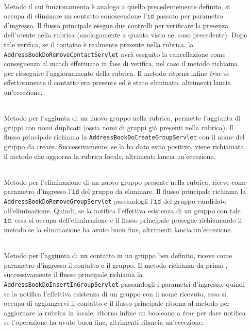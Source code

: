 \begin{description}
	\item{}\\
Metodo il cui funzionamento è analogo a quello precedentemente definito, si occupa di eliminare un contatto conoscendone l'\texttt{id} passato per parametro d'ingresso. Il flusso principale esegue due controlli per verificare la presenza dell'utente nella rubrica (analogamente a quanto visto nel caso precedente). 
Dopo tale verifica, se il contatto è realmente presente nella rubrica, la  \texttt{AddressBookDoRemoveContactServlet} avrà eseguito la cancellazione come conseguenza al match effettuato in fase di verifica, nel caso il metodo richiama  per rieseguire l'aggiornamento della rubrica. Il metodo ritorna infine \textit{true} se effettivamente il contatto era presente ed è stato eliminato, altrimenti lancia un'eccezione.

	\item{}\\
	Metodo per l'aggiunta di un nuovo gruppo nella rubrica, permette l'aggiunta di gruppi con nomi duplicati (ossia nomi di gruppi già presenti nella rubrica). Il flusso principale richiama la  \texttt{AddressBookDoCreateGroupServlet} con il nome del gruppo da creare. Successivamente, se la  ha dato  esito positivo, viene richiamata il metodo  che aggiorna la rubrica locale, altrimenti lancia un'eccezione.
	
	\item{}\\
	Metodo per l'eliminazione di un nuovo gruppo presente nella rubrica, riceve come parametro d'ingresso l'\texttt{id} del gruppo da eliminare. Il flusso principale richiama la  \texttt{AddressBookDoRemoveGroupServlet} passandogli l'\texttt{id} del gruppo candidato all'eliminazione. Quindi, se la  notifica l'effettiva esistenza di un gruppo con tale \texttt{id}, essa si occupa dell'eliminazione e il flusso principale prosegue richiamando il metodo  se la eliminazione ha avuto buon fine, altrimenti lancia un'eccezione.
	
	\item{}\\
	Metodo per l'aggiunta di un contatto in un gruppo ben definito, riceve come parametro d'ingresso il contatto e il gruppo.
Il metodo richiama da prima , successivamente il flusso principale richiama la  \texttt{AddressBookDoInsertInGroupServlet} passandogli i parametri d'ingresso, quindi se la  notifica l'effettiva esistenza di un gruppo con il nome ricevuto, essa si occupa di aggiungervi il contatto e il flusso principale ritorna al metodo  per aggiornare la rubrica in locale, ritorna infine un  booleano a \textit{true} per dare notifica se l'operazione ha avuto buon fine, altrimenti rilancia un'eccezione.
	

\end{description}
